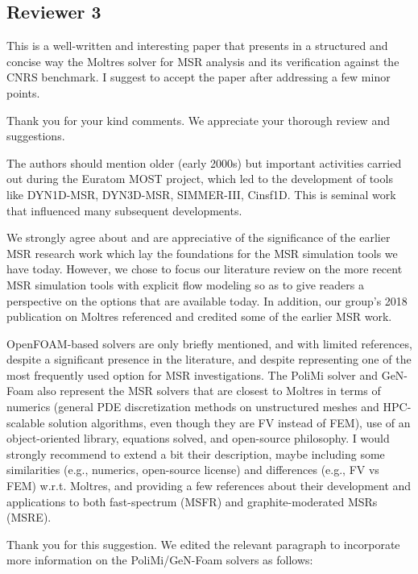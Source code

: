 \documentclass[answers,11pt]{exam}
\begin{document}
\begin{questions}
\section*{Reviewer 3}
        \question This is a well-written and interesting paper that presents in a structured and concise way the Moltres solver for MSR analysis and its verification against the CNRS benchmark. I suggest to accept the paper after addressing a few minor points.
        \begin{solution}
            Thank you for your kind comments. We appreciate your thorough
            review and suggestions.
        \end{solution}
        \question The authors should mention older (early 2000s) but important
        activities carried out during the Euratom MOST project, which led to
        the development of tools like DYN1D-MSR, DYN3D-MSR, SIMMER-III,
        Cinsf1D. This is seminal work that influenced many subsequent developments.
        \begin{solution}
        	We strongly agree about and are appreciative of the significance of
        	the earlier MSR research work
        	which lay the foundations for the MSR simulation tools we have
        	today. However, we chose to focus our literature review on the
        	more recent MSR simulation tools with explicit flow modeling so as
        	to give readers a
        	perspective on the options that are available today. In addition,
        	our group's 2018 publication on Moltres
        	\cite{lindsay_introduction_2018} referenced and credited some of
        	the earlier MSR work.
        \end{solution}

        \question OpenFOAM-based solvers are only briefly mentioned, and with
        limited references, despite a significant presence in the literature,
        and despite representing one of the most frequently used option for MSR
        investigations. The PoliMi solver and GeN-Foam also represent the MSR
        solvers that are closest to Moltres in terms of numerics (general PDE
        discretization methods on unstructured meshes and HPC-scalable solution
        algorithms,  even though they are FV instead of FEM), use of an
        object-oriented library, equations solved, and open-source philosophy.
        I would strongly recommend to extend a bit their description, maybe
        including some similarities (e.g., numerics, open-source license) and
        differences (e.g., FV vs FEM) w.r.t. Moltres, and providing a few
        references about their development and applications to both
        fast-spectrum (MSFR) and graphite-moderated MSRs (MSRE).
        \begin{solution}
        	Thank you for this suggestion. We edited the relevant paragraph to
        	incorporate more information on the PoliMi/GeN-Foam solvers as
        	follows:
        	

\end{solution}
\end{questions}
\end{document}
